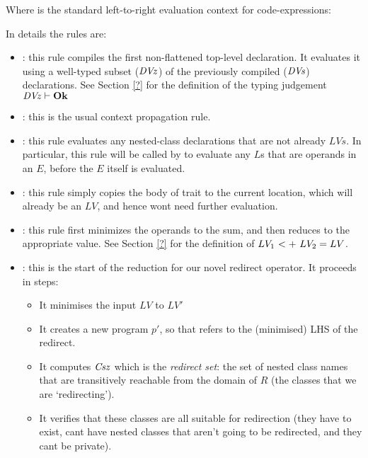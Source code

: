 Where  is the standard left-to-right evaluation context for code-expressions:\\
\indent\begin{bnf}
  {}
\end{bnf}

\noindent In details the rules are:
\begin{itemize}
	\item {}: this rule compiles the first non-flattened top-level declaration. It evaluates it using a well-typed subset ($\mathit{DVz}$) of the previously compiled ($\textit{DVs}$) declarations. See Section \ref{?} for the definition of the typing judgement $\mathit{DVz}\vdash\textbf{Ok}$ 
	\item {}: this is the usual context propagation rule.
	\item {}: this rule evaluates any nested-class declarations that are not already $LVs$. In particular, this rule will be called by  to evaluate any $L$s that are operands in an $E$, before the $E$ itself is evaluated.
	\item {}: this rule simply copies the body of trait to the current location, which will already be an $LV$, and hence wont need further evaluation.
	\item {}: this rule first minimizes the operands to the sum, and then reduces to the appropriate value. See Section \ref{?} for the definition of $\summ{LV_1}{LV_2}=LV$.
	\item {}: this is the start of the reduction for our novel redirect operator. It proceeds in steps:
	\begin{itemize}
		\item It minimises the input $LV$ to $LV'$
		\item It creates a new program $p'$, so that  refers to the (minimised) LHS of the redirect.
		\item It computes $\mathit{Csz}$ which is the \emph{redirect set}: the set of nested class names that are transitively reachable from the domain of $R$ (the classes that we are `redirecting').
		\item It verifies that these classes are all suitable for redirection (they have to exist, cant have nested classes that aren't going to be redirected, and they cant be private).

\end{itemize}
\end{itemize}
